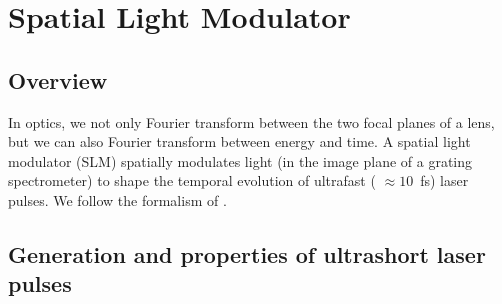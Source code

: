 \renewcommand{\lastmod}{October 27, 2023}
\renewcommand{\chapterauthors}{Markus Lippitz, Christoph Schnupfhagn}

\chapter{Spatial Light Modulator}

\section{Overview}

In optics, we not only Fourier transform between the two focal planes of a lens, but we can also Fourier transform between energy and time. A spatial light modulator (SLM) spatially modulates light (in the image plane of a grating spectrometer) to shape the temporal evolution of ultrafast ( $\approx 10$~fs) laser pulses. We follow the formalism of \cite{Traeger2012}.

\section{Generation and properties of ultrashort laser pulses}

